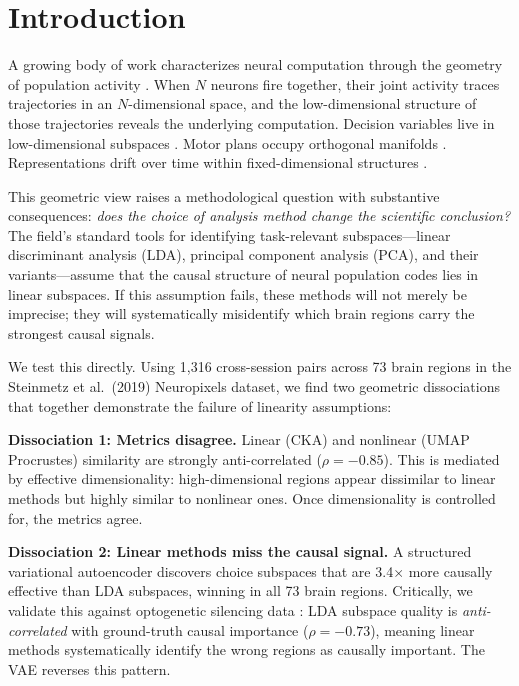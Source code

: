 \documentclass{article}
\begin{document}
\section{Introduction}

A growing body of work characterizes neural computation through the geometry of population activity \citep{cunningham2014dimensionality, gallego2017neural}. When $N$ neurons fire together, their joint activity traces trajectories in an $N$-dimensional space, and the low-dimensional structure of those trajectories reveals the underlying computation. Decision variables live in low-dimensional subspaces \citep{steinmetz2019distributed}. Motor plans occupy orthogonal manifolds \citep{gallego2017neural}. Representations drift over time within fixed-dimensional structures \citep{driscoll2022representational}.

This geometric view raises a methodological question with substantive consequences: \emph{does the choice of analysis method change the scientific conclusion?} The field's standard tools for identifying task-relevant subspaces---linear discriminant analysis (LDA), principal component analysis (PCA), and their variants---assume that the causal structure of neural population codes lies in linear subspaces. If this assumption fails, these methods will not merely be imprecise; they will systematically misidentify which brain regions carry the strongest causal signals.

We test this directly. Using 1,316 cross-session pairs across 73 brain regions in the Steinmetz et al.\ (2019) Neuropixels dataset, we find two geometric dissociations that together demonstrate the failure of linearity assumptions:

\textbf{Dissociation 1: Metrics disagree.} Linear (CKA) and nonlinear (UMAP Procrustes) similarity are strongly anti-correlated ($\rho = -0.85$). This is mediated by effective dimensionality: high-dimensional regions appear dissimilar to linear methods but highly similar to nonlinear ones. Once dimensionality is controlled for, the metrics agree.

\textbf{Dissociation 2: Linear methods miss the causal signal.} A structured variational autoencoder \citep{narayanaswamy2017learning} discovers choice subspaces that are 3.4$\times$ more causally effective than LDA subspaces, winning in all 73 brain regions. Critically, we validate this against optogenetic silencing data \citep{zatkahaas2021spatiotemporal}: LDA subspace quality is \emph{anti-correlated} with ground-truth causal importance ($\rho = -0.73$), meaning linear methods systematically identify the wrong regions as causally important. The VAE reverses this pattern.
\end{document}
